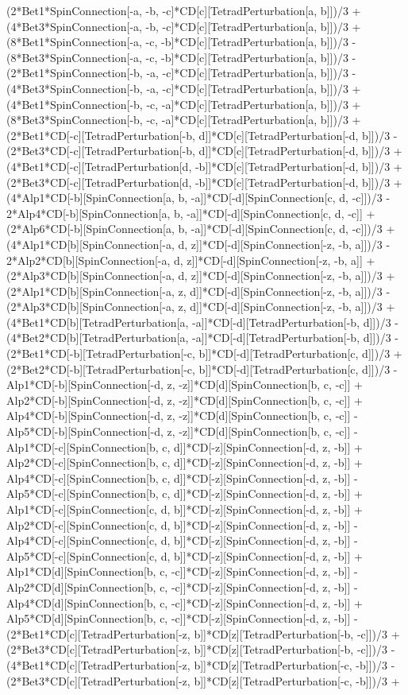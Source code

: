 (2*Bet1*SpinConnection[-a, -b, -c]*CD[c][TetradPerturbation[a, b]])/3 + (4*Bet3*SpinConnection[-a, -b, -c]*CD[c][TetradPerturbation[a, b]])/3 + (8*Bet1*SpinConnection[-a, -c, -b]*CD[c][TetradPerturbation[a, b]])/3 - (8*Bet3*SpinConnection[-a, -c, -b]*CD[c][TetradPerturbation[a, b]])/3 - (2*Bet1*SpinConnection[-b, -a, -c]*CD[c][TetradPerturbation[a, b]])/3 - (4*Bet3*SpinConnection[-b, -a, -c]*CD[c][TetradPerturbation[a, b]])/3 + (4*Bet1*SpinConnection[-b, -c, -a]*CD[c][TetradPerturbation[a, b]])/3 + (8*Bet3*SpinConnection[-b, -c, -a]*CD[c][TetradPerturbation[a, b]])/3 + (2*Bet1*CD[-c][TetradPerturbation[-b, d]]*CD[c][TetradPerturbation[-d, b]])/3 - (2*Bet3*CD[-c][TetradPerturbation[-b, d]]*CD[c][TetradPerturbation[-d, b]])/3 + (4*Bet1*CD[-c][TetradPerturbation[d, -b]]*CD[c][TetradPerturbation[-d, b]])/3 + (2*Bet3*CD[-c][TetradPerturbation[d, -b]]*CD[c][TetradPerturbation[-d, b]])/3 + (4*Alp1*CD[-b][SpinConnection[a, b, -a]]*CD[-d][SpinConnection[c, d, -c]])/3 - 2*Alp4*CD[-b][SpinConnection[a, b, -a]]*CD[-d][SpinConnection[c, d, -c]] + (2*Alp6*CD[-b][SpinConnection[a, b, -a]]*CD[-d][SpinConnection[c, d, -c]])/3 + (4*Alp1*CD[b][SpinConnection[-a, d, z]]*CD[-d][SpinConnection[-z, -b, a]])/3 - 2*Alp2*CD[b][SpinConnection[-a, d, z]]*CD[-d][SpinConnection[-z, -b, a]] + (2*Alp3*CD[b][SpinConnection[-a, d, z]]*CD[-d][SpinConnection[-z, -b, a]])/3 + (2*Alp1*CD[b][SpinConnection[-a, z, d]]*CD[-d][SpinConnection[-z, -b, a]])/3 - (2*Alp3*CD[b][SpinConnection[-a, z, d]]*CD[-d][SpinConnection[-z, -b, a]])/3 + (4*Bet1*CD[b][TetradPerturbation[a, -a]]*CD[-d][TetradPerturbation[-b, d]])/3 - (4*Bet2*CD[b][TetradPerturbation[a, -a]]*CD[-d][TetradPerturbation[-b, d]])/3 - (2*Bet1*CD[-b][TetradPerturbation[-c, b]]*CD[-d][TetradPerturbation[c, d]])/3 + (2*Bet2*CD[-b][TetradPerturbation[-c, b]]*CD[-d][TetradPerturbation[c, d]])/3 - Alp1*CD[-b][SpinConnection[-d, z, -z]]*CD[d][SpinConnection[b, c, -c]] + Alp2*CD[-b][SpinConnection[-d, z, -z]]*CD[d][SpinConnection[b, c, -c]] + Alp4*CD[-b][SpinConnection[-d, z, -z]]*CD[d][SpinConnection[b, c, -c]] - Alp5*CD[-b][SpinConnection[-d, z, -z]]*CD[d][SpinConnection[b, c, -c]] - Alp1*CD[-c][SpinConnection[b, c, d]]*CD[-z][SpinConnection[-d, z, -b]] + Alp2*CD[-c][SpinConnection[b, c, d]]*CD[-z][SpinConnection[-d, z, -b]] + Alp4*CD[-c][SpinConnection[b, c, d]]*CD[-z][SpinConnection[-d, z, -b]] - Alp5*CD[-c][SpinConnection[b, c, d]]*CD[-z][SpinConnection[-d, z, -b]] + Alp1*CD[-c][SpinConnection[c, d, b]]*CD[-z][SpinConnection[-d, z, -b]] + Alp2*CD[-c][SpinConnection[c, d, b]]*CD[-z][SpinConnection[-d, z, -b]] - Alp4*CD[-c][SpinConnection[c, d, b]]*CD[-z][SpinConnection[-d, z, -b]] - Alp5*CD[-c][SpinConnection[c, d, b]]*CD[-z][SpinConnection[-d, z, -b]] + Alp1*CD[d][SpinConnection[b, c, -c]]*CD[-z][SpinConnection[-d, z, -b]] - Alp2*CD[d][SpinConnection[b, c, -c]]*CD[-z][SpinConnection[-d, z, -b]] - Alp4*CD[d][SpinConnection[b, c, -c]]*CD[-z][SpinConnection[-d, z, -b]] + Alp5*CD[d][SpinConnection[b, c, -c]]*CD[-z][SpinConnection[-d, z, -b]] - (2*Bet1*CD[c][TetradPerturbation[-z, b]]*CD[z][TetradPerturbation[-b, -c]])/3 + (2*Bet3*CD[c][TetradPerturbation[-z, b]]*CD[z][TetradPerturbation[-b, -c]])/3 - (4*Bet1*CD[c][TetradPerturbation[-z, b]]*CD[z][TetradPerturbation[-c, -b]])/3 - (2*Bet3*CD[c][TetradPerturbation[-z, b]]*CD[z][TetradPerturbation[-c, -b]])/3 + 